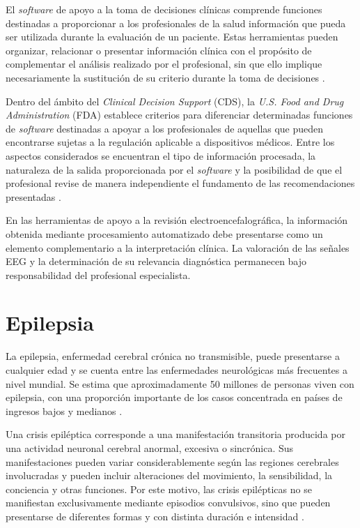 El \textit{software} de apoyo a la toma de decisiones clínicas comprende funciones
destinadas a proporcionar a los profesionales de la salud información que
pueda ser utilizada durante la evaluación de un paciente. Estas herramientas
pueden organizar, relacionar o presentar información clínica con el propósito
de complementar el análisis realizado por el profesional, sin que ello
implique necesariamente la sustitución de su criterio durante la toma de
decisiones \citep{FDA2026CDS}.

Dentro del ámbito del \textit{Clinical Decision Support} (CDS), la
\textit{U.S. Food and Drug Administration} (FDA) establece criterios para
diferenciar determinadas funciones de \textit{software} destinadas a apoyar
a los profesionales de aquellas que pueden encontrarse sujetas a la
regulación aplicable a dispositivos médicos. Entre los aspectos
considerados se encuentran el tipo de información procesada, la
naturaleza de la salida proporcionada por el \textit{software} y la
posibilidad de que el profesional revise de manera independiente el
fundamento de las recomendaciones presentadas \citep{FDA2026CDS}.

En las herramientas de apoyo a la revisión electroencefalográfica, la
información obtenida mediante procesamiento automatizado debe presentarse
como un elemento complementario a la interpretación clínica. La valoración
de las señales EEG y la determinación de su relevancia diagnóstica
permanecen bajo responsabilidad del profesional especialista.

\section{Epilepsia}
\label{sec:epilepsia}

La epilepsia, enfermedad cerebral crónica no transmisible, puede presentarse
a cualquier edad y se cuenta entre las enfermedades neurológicas más
frecuentes a nivel mundial. Se estima que aproximadamente
50 millones de personas viven con epilepsia, con una proporción importante
de los casos concentrada en países de ingresos bajos y medianos
\citep{WHO2024Epilepsy}.

Una crisis epiléptica corresponde a una manifestación transitoria producida
por una actividad neuronal cerebral anormal, excesiva o sincrónica. Sus
manifestaciones pueden variar considerablemente según las regiones cerebrales
involucradas y pueden incluir alteraciones del movimiento, la sensibilidad,
la conciencia y otras funciones. Por este motivo, las crisis
epilépticas no se manifiestan exclusivamente mediante episodios convulsivos,
sino que pueden presentarse de diferentes formas y con distinta duración e
intensidad \citep{Fisher2014EpilepsyDefinition,WHO2024Epilepsy}.

